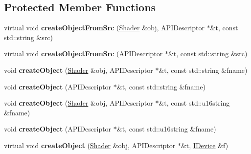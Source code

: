 \subsection*{Protected Member Functions}
\begin{DoxyCompactItemize}
\item 
\hypertarget{class_tempest_1_1_shader_holder_a9cd90d9681be0bfd4c49d6e522556136}{virtual void {\bfseries create\+Object\+From\+Src} (\hyperlink{class_tempest_1_1_shader}{Shader} \&obj, A\+P\+I\+Descriptor $\ast$\&t, const std\+::string \&src)}\label{class_tempest_1_1_shader_holder_a9cd90d9681be0bfd4c49d6e522556136}

\item 
\hypertarget{class_tempest_1_1_shader_holder_aa4b88450886331cebf4b2188fe27b9ad}{virtual void {\bfseries create\+Object\+From\+Src} (A\+P\+I\+Descriptor $\ast$\&t, const std\+::string \&src)}\label{class_tempest_1_1_shader_holder_aa4b88450886331cebf4b2188fe27b9ad}

\item 
\hypertarget{class_tempest_1_1_shader_holder_a9c46ac54e73db656a80f02b167d4a78b}{void {\bfseries create\+Object} (\hyperlink{class_tempest_1_1_shader}{Shader} \&obj, A\+P\+I\+Descriptor $\ast$\&t, const std\+::string \&fname)}\label{class_tempest_1_1_shader_holder_a9c46ac54e73db656a80f02b167d4a78b}

\item 
\hypertarget{class_tempest_1_1_shader_holder_af5d9001620da21c84f9d524e728d9af2}{void {\bfseries create\+Object} (A\+P\+I\+Descriptor $\ast$\&t, const std\+::string \&fname)}\label{class_tempest_1_1_shader_holder_af5d9001620da21c84f9d524e728d9af2}

\item 
\hypertarget{class_tempest_1_1_shader_holder_a196965734f0b0ca5bf5cb82865904d8a}{void {\bfseries create\+Object} (\hyperlink{class_tempest_1_1_shader}{Shader} \&obj, A\+P\+I\+Descriptor $\ast$\&t, const std\+::u16string \&fname)}\label{class_tempest_1_1_shader_holder_a196965734f0b0ca5bf5cb82865904d8a}

\item 
\hypertarget{class_tempest_1_1_shader_holder_ad12ba2a0b3cee02e9bc57861cc1ba066}{void {\bfseries create\+Object} (A\+P\+I\+Descriptor $\ast$\&t, const std\+::u16string \&fname)}\label{class_tempest_1_1_shader_holder_ad12ba2a0b3cee02e9bc57861cc1ba066}

\item 
\hypertarget{class_tempest_1_1_shader_holder_aed1dcd8dc55eed38deae459f5d70224a}{virtual void {\bfseries create\+Object} (\hyperlink{class_tempest_1_1_shader}{Shader} \&obj, A\+P\+I\+Descriptor $\ast$\&t, \hyperlink{class_tempest_1_1_i_device}{I\+Device} \&f)}\label{class_tempest_1_1_shader_holder_aed1dcd8dc55eed38deae459f5d70224a}


\end{DoxyCompactItemize}
